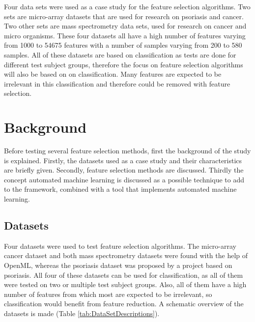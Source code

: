 \documentclass[10pt,a4paper]{article}
\begin{document}
	Four data sets were used as a case study for the feature selection algorithms. Two sets are micro-array datasets that are used for research on psoriasis\cite{nair2009genome, suarez2012expanding, bigler2013cross, yao2008type} and cancer\cite{wojnarski2010rsctc}. Two other sets are mass spectrometry data sets, used for research on cancer\cite{NIPS2004_2728} and micro organisms\cite{doi:10.1093/bioinformatics/btu022}. These four datasets all have a high number of features varying from 1000 to 54675 features with a number of samples varying from 200 to 580 samples. All of these datasets are based on classification as tests are done for different test subject groups, therefore the focus on feature selection algorithms will also be based on on classification. Many features are expected to be irrelevant in this classification and therefore could be removed with feature selection.	
	
	\newpage
	\section{Background}
	\label{sec:Background}
	
	Before testing several feature selection methods, first the background of the study is explained. Firstly, the datasets used as a case study and their characteristics are briefly given. Secondly, feature selection methods are discussed. Thirdly the concept automated machine learning is discussed as a possible technique to add to the framework, combined with a tool that implements automated machine learning.
	
	\subsection{Datasets}
	\label{subsec:Datasets}
	
	Four datasets were used to test feature selection algorithms. The micro-array cancer dataset and both mass spectrometry datasets were found with the help of OpenML\cite{OpenML2013}, whereas the psoriasis dataset was proposed by a project based on psoriasis\cite{felix2017dynamic}. All four of these datasets can be used for classification, as all of them were tested on two or multiple test subject groups. Also, all of them have a high number of features from which most are expected to be irrelevant, so classification would benefit from feature reduction. A schematic overview of the datasets is made (Table \ref{tab:DataSetDescriptions}).
	
\end{document}
